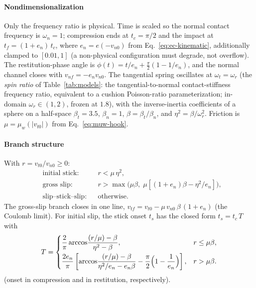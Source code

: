 \paragraph{Nondimensionalization} Only the frequency ratio is
physical. Time is scaled so the normal contact frequency is
$\omega_n = 1$; compression ends at $t_c = \pi/2$ and the impact at
$t_f = (1 + e_n)\,t_c$, where $e_n = e(-v_{n0})$ from
Eq.~\eqref{eq:ec-kinematic}, additionally clamped to $[0.01, 1]$ (a
non-physical configuration must degrade, not overflow). The
restitution-phase angle is $\phi(t) = t/e_n + \tfrac{\pi}{2}(1 -
1/e_n)$, and the normal channel closes with
$v_{nf} = -e_n v_{n0}$. The tangential spring oscillates at
$\omega_t = \omega_r$ (the \emph{spin ratio} of
Table~\ref{tab:models}: the tangential-to-normal contact-stiffness
frequency ratio, equivalent to a cushion Poisson-ratio
parameterization; in-domain $\omega_r \in (1,2)$, frozen at
$1.8$), with the inverse-inertia coefficients of a sphere on a
half-space $\beta_t = 3.5$, $\beta_n = 1$,
$\beta = \beta_t/\beta_n$, and $\eta^{2} = \beta/\omega_r^{2}$.
Friction is $\mu = \mu_w(|v_{t0}|)$ from Eq.~\eqref{eq:muw-hook}.

\paragraph{Branch structure} With $r = v_{t0}/v_{n0} \ge 0$:
\begin{equation}
\begin{aligned}
&\text{initial stick:} && r < \mu\,\eta^{2},\\
&\text{gross slip:} && r > \max\bigl(\mu\beta,\;
\mu[(1+e_n)\beta - \eta^{2}/e_n]\bigr),\\
&\text{slip--stick--slip:} && \text{otherwise.}
\end{aligned}
\label{eq:stronge-branches}
\end{equation}
The gross-slip branch closes in one line,
$v_{tf} = v_{t0} - \mu\,v_{n0}\,\beta\,(1+e_n)$ (the Coulomb
limit). For initial slip, the stick onset $t_s$ has the closed form
$t_s = t_c\,T$ with
\begin{equation}
T =
\begin{cases}
\dfrac{2}{\pi}\arccos\!\dfrac{(r/\mu) - \beta}{\eta^{2} - \beta}, &
r \le \mu\beta,\\[8pt]
\dfrac{2 e_n}{\pi}\left[\arccos\!\dfrac{(r/\mu) - \beta}
{\eta^{2}/e_n - e_n\beta} - \dfrac{\pi}{2}\Bigl(1 -
\dfrac{1}{e_n}\Bigr)\right], &
r > \mu\beta .
\end{cases}
\label{eq:stronge-tstick}
\end{equation}
(onset in compression and in restitution, respectively).

